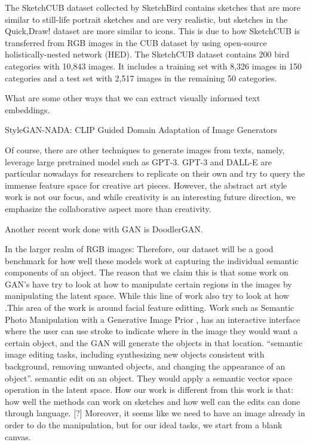 The SketchCUB dataset collected by SketchBird contains sketches that are more similar to still-life portrait sketches and are very realistic, but sketches in the Quick,Draw! dataset are more similar to icons. This is due to how SketchCUB is transferred from RGB images in the CUB dataset by using open-source holistically-nested network (HED). The SketchCUB dataset contains
200 bird categories with 10,843 images. It includes a training set with 8,326 images in 150 categories and a test set with 2,517 images in the remaining 50 categories.  

What are some other ways that we can extract visually informed text embeddings. 

StyleGAN-NADA: CLIP Guided Domain Adaptation of Image Generators

Of course, there are other techniques to generate images from texts, namely, leverage large pretrained model such as GPT-3. GPT-3 and DALL-E are particular nowadays for researchers to replicate on their own and try to query the immense feature space for creative art pieces. However, the abstract art style work is not our focus, and while creativity is an interesting future direction, we emphasize the collaborative aspect more than creativity. 

Another recent work done with GAN is DoodlerGAN.  

In the larger realm of RGB images:
Therefore, our dataset will be a good benchmark for how well these models work at capturing the individual semantic components of an object. The reason that we claim this is that some work on GAN's have try to look at how to manipulate certain regions in the images by manipulating the latent space. While this line of work also try to look at how .This area of the work is around facial feature editting. Work such as Semantic Photo Manipulation with a Generative Image Prior \citep{Bau:Ganpaint:2019}, has an interactive interface where the user can use stroke to indicate where in the image they would want a certain object, and the GAN will generate the objects in that location. ``semantic image editing tasks, including synthesizing new objects consistent with background, removing unwanted objects, and changing the appearance of an object''. semantic edit on an object. They would apply a semantic vector space operation in the latent space. How our work is different from this work is that: how well the methods can work on sketches and how well can the edits can done through language. [?] Moreover, it seems like we need to have an image already in order to do the manipulation, but for our ideal tasks, we start from a blank canvas.


